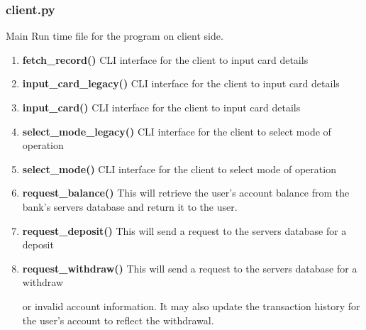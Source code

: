\documentclass{article}
\begin{document}
\subsubsection{client.py}
Main Run time file for the program on client side.
\begin{enumerate}
    \item \textbf{fetch\_record()}
    CLI interface for the client to input card details
    \item \textbf{input\_card\_legacy()}
    CLI interface for the client to input card details
    \item \textbf{input\_card()}
    CLI interface for the client to input card details
    \item \textbf{select\_mode\_legacy()}
    CLI interface for the client to select mode of operation
    \item \textbf{select\_mode()}
    CLI interface for the client to select mode of operation
    \item \textbf{request\_balance()}
    This will retrieve the user's account balance from the bank's servers database and return it to the user.
    \item \textbf{request\_deposit()}
    This will send a request to the servers database for a deposit
    \item \textbf{request\_withdraw()}
    This will send a request to the servers database for a withdraw

 or invalid account information. It may also update the transaction history for the user's account to reflect the withdrawal.
\end{enumerate}
\end{document}

